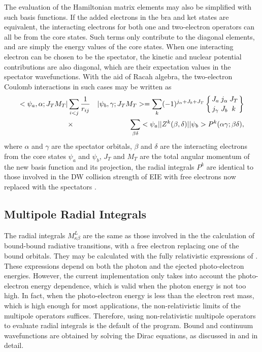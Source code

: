 \documentclass{elsart}
\newcommand{\sixj}[6]{\ensuremath{\left\{{#1\atop #4}{#2\atop #5}
{#3\atop #6}\right\}}}
\begin{document}
The evaluation of the Hamiltonian matrix elements may also be simplified with
such basis functions. If the added electrons in the bra and ket states are
equivalent, the 
interacting electrons for both one and two-electron operators can all be from
the core states. Such terms only contribute to the diagonal elements, and are
simply the energy values of the core states. When one interacting electron can
be chosen to be the spectator, the kinetic and nuclear potential contributions
are also diagonal, which are their expectation values in the spectator
wavefunctions. With the aid of Racah algebra, the two-electron Coulomb
interactions in such cases may be written as \citep{barshalom88} 
\begin{eqnarray}
<\psi_a,\alpha;J_TM_T|&\sum_{i<j}\frac{1}{r_{ij}}&|\psi_b,\gamma;J_TM_T> = 
\sum_k
(-1)^{j_\alpha+J_b+J_T}\sixj{J_a}{j_\alpha}{J_T}{j_\gamma}{J_b}{k}\nonumber\\
&\times&
\sum_{\beta\delta}<\psi_a||Z^k(\beta,\delta)||\psi_b>
P^k(\alpha\gamma;\beta\delta),
\end{eqnarray}
where $\alpha$ and $\gamma$ are the spectator orbitals, $\beta$ and $\delta$
are the interacting electrons from the core states $\psi_a$ and $\psi_b$, $J_T$
and $M_T$ are the total angular momentum of the new basis function and its
projection, 
the radial integrals $P^k$ are identical to those involved in the DW collision
strength of EIE with free electrons now replaced with the spectators
\citep{gu01b}. 

\subsection{Multipole Radial Integrals}
The radial integrals $M^L_{\kappa\beta}$ are the same as those involved in the
the calculation of bound-bound radiative transitions, with a free electron
replacing one of the bound orbitals. They may be calculated with the fully
relativistic expressions of \citet{grant74}. These expressions depend on
both the photon and the ejected photo-electron energies. However, the current
implementation only takes into account the photo-electron energy dependence,
which is valid when the photon energy is not too high. In fact, when the
photo-electron energy is less than the electron rest mass, which is high
enough for most applications, the non-relativistic limits of the multipole
operators suffices. Therefore, using non-relativistic multipole operators to
evaluate radial integrals is the default of the program. 
Bound and continuum wavefunctions are obtained by solving the Dirac equations,
as discussed in  and  in detail.   
\end{document}
